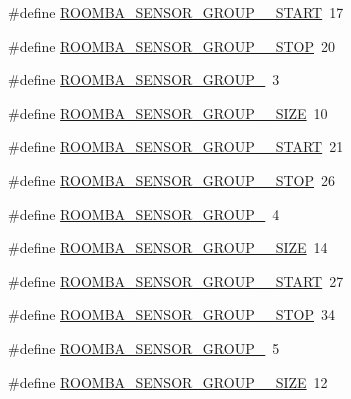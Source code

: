 \begin{DoxyCompactItemize}
\item 
\#define \hyperlink{group__roomba__sensor__group_ga94d3aed8b9f236cc333d9d09be2fe843}{R\-O\-O\-M\-B\-A\-\_\-\-S\-E\-N\-S\-O\-R\-\_\-\-G\-R\-O\-U\-P\-\_\-\_\-\-S\-T\-A\-R\-T}~17
\item 
\#define \hyperlink{group__roomba__sensor__group_ga22518aa318dac5e32015423c1ed53a17}{R\-O\-O\-M\-B\-A\-\_\-\-S\-E\-N\-S\-O\-R\-\_\-\-G\-R\-O\-U\-P\-\_\-\_\-\-S\-T\-O\-P}~20
\item 
\#define \hyperlink{group__roomba__sensor__group_ga1494e5fb5305016e8b6d01f5733f87db}{R\-O\-O\-M\-B\-A\-\_\-\-S\-E\-N\-S\-O\-R\-\_\-\-G\-R\-O\-U\-P\-\_}~3
\item 
\#define \hyperlink{group__roomba__sensor__group_ga3ba7802db1abcdead2df2c3de06bd5a0}{R\-O\-O\-M\-B\-A\-\_\-\-S\-E\-N\-S\-O\-R\-\_\-\-G\-R\-O\-U\-P\-\_\-\_\-\-S\-I\-Z\-E}~10
\item 
\#define \hyperlink{group__roomba__sensor__group_ga66328f6ebdb3c0e1dbe9a58ff478c9ce}{R\-O\-O\-M\-B\-A\-\_\-\-S\-E\-N\-S\-O\-R\-\_\-\-G\-R\-O\-U\-P\-\_\-\_\-\-S\-T\-A\-R\-T}~21
\item 
\#define \hyperlink{group__roomba__sensor__group_ga00e9abfcc71ee460f3844e257d8bc3c7}{R\-O\-O\-M\-B\-A\-\_\-\-S\-E\-N\-S\-O\-R\-\_\-\-G\-R\-O\-U\-P\-\_\-\_\-\-S\-T\-O\-P}~26
\item 
\#define \hyperlink{group__roomba__sensor__group_gac5b1a680645329aca347a0eeddc8e89c}{R\-O\-O\-M\-B\-A\-\_\-\-S\-E\-N\-S\-O\-R\-\_\-\-G\-R\-O\-U\-P\-\_}~4
\item 
\#define \hyperlink{group__roomba__sensor__group_gaab619a0f35cf62bba045ac5a645950c0}{R\-O\-O\-M\-B\-A\-\_\-\-S\-E\-N\-S\-O\-R\-\_\-\-G\-R\-O\-U\-P\-\_\-\_\-\-S\-I\-Z\-E}~14
\item 
\#define \hyperlink{group__roomba__sensor__group_ga60468a9e12ec7280ebcfa8d72cbb21f1}{R\-O\-O\-M\-B\-A\-\_\-\-S\-E\-N\-S\-O\-R\-\_\-\-G\-R\-O\-U\-P\-\_\-\_\-\-S\-T\-A\-R\-T}~27
\item 
\#define \hyperlink{group__roomba__sensor__group_ga59e22d23bd3d4b1470777a608bcd01fb}{R\-O\-O\-M\-B\-A\-\_\-\-S\-E\-N\-S\-O\-R\-\_\-\-G\-R\-O\-U\-P\-\_\-\_\-\-S\-T\-O\-P}~34
\item 
\#define \hyperlink{group__roomba__sensor__group_ga2a092d053a2348341535f789206b9069}{R\-O\-O\-M\-B\-A\-\_\-\-S\-E\-N\-S\-O\-R\-\_\-\-G\-R\-O\-U\-P\-\_}~5
\item 
\#define \hyperlink{group__roomba__sensor__group_ga4df9b155dba5dccf8cd425a49beb69f2}{R\-O\-O\-M\-B\-A\-\_\-\-S\-E\-N\-S\-O\-R\-\_\-\-G\-R\-O\-U\-P\-\_\-\_\-\-S\-I\-Z\-E}~12

\end{DoxyCompactItemize}

